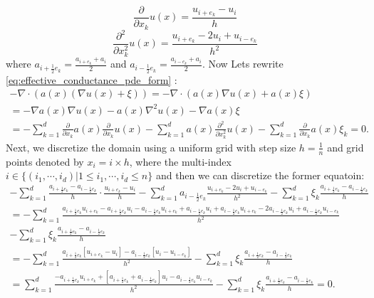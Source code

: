 \begin{equation}
\frac{\partial}{\partial x_k} u(x) = \frac{u_{i+e_{k}} - u_{i}}{h}
\end{equation}
\begin{equation}
\frac{\partial^2}{\partial x_k^2} u(x) = \frac{u_{i+e_{k}} - 2 u_{i} + u_{i-e_{k}}}{h^2}
\end{equation}
where $a_{i+\frac{1}{2}e_{k}} = \frac{a_{i+e_{k}} + a_{i}}{2}$ and $a_{i-\frac{1}{2}e_{k}} = \frac{a_{i-e_{k}} + a_{i}}{2}$. Now Lets rewrite \eqref{eq:effective_conductance_pde_form} :
\begin{multline*}
-\nabla\cdot (a(x)(\nabla u(x)+\xi)) = -\nabla\cdot (a(x)\nabla u(x) + a(x) \xi) \\
= -\nabla a(x) \nabla u(x) - a(x) \nabla^2 u(x) - \nabla a(x)\xi \\
= - \sum_{k=1}^{d} \frac{\partial}{\partial x_k} a(x) \frac{\partial}{\partial x_k} u(x) - \sum_{k=1}^{d} a(x) \frac{\partial^2}{\partial x_k^2} u(x) - \sum_{k=1}^{d} \frac{\partial}{\partial x_k} a(x) \xi_k = 0.
\end{multline*}
Next, we discretize the domain using a uniform grid with step size $h=\frac{1}{n}$ and grid points denoted by $x_i = i \times h$, where the multi-index $i\in\{(i_1,\cdots,i_d)| 1\leq i_1,\cdots,i_d\leq n\}$ and then we can discretize the former equatoin:
\begin{multline*}
-\sum_{k=1}^{d} \frac{a_{i+\frac{1}{2}e_{k}} - a_{i-\frac{1}{2}e_{k}}}{h} \cdot \frac{u_{i+e_{k}} - u_{i}}{h} - \sum_{k=1}^{d} a_{i-\frac{1}{2} e_k}  \frac{u_{i+e_{k}} - 2 u_{i} + u_{i-e_{k}}}{h^2} - \sum_{k=1}^{d} \xi_k \frac{a_{i+\frac{1}{2}e_{k}} - a_{i-\frac{1}{2}e_{k}}}{h} \\
= - \sum_{k=1}^{d} \frac{ a_{i+\frac{1}{2}e_{k}} u_{i+e_k} - a_{i+\frac{1}{2}e_{k}} u_i - a_{i-\frac{1}{2}e_{k}} u_{i+e_k} + a_{i-\frac{1}{2}e_{k}} u_i + a_{i-\frac{1}{2}e_{k}} u_{i+e_k} - 2 a_{i-\frac{1}{2}e_{k}} u_i + a_{i-\frac{1}{2}e_{k}} u_{i-e_k}}{h^2} \\ - \sum_{k=1}^{d} \xi_k \frac{a_{i+\frac{1}{2}e_{k}} - a_{i-\frac{1}{2}e_{k}}}{h} \\
= - \sum_{k=1}^{d} \frac{ a_{i+\frac{1}{2}e_{k}} [u_{i+e_k} - u_i] -  a_{i-\frac{1}{2}e_{k}} [u_i - u_{i-e_k}]}{h^2} - \sum_{k=1}^{d} \xi_k \frac{a_{i+\frac{1}{2}e_{k}} - a_{i-\frac{1}{2}e_{k}}}{h}  \\
= \sum_{k=1}^{d} \frac{- a_{i+\frac{1}{2}e_{k}} u_{i+e_k} + [a_{i+\frac{1}{2}e_{k}} + a_{i-\frac{1}{2}e_{k}}] u_i - a_{i-\frac{1}{2}e_{k}} u_{i-e_k}}{h^2} - \sum_{k=1}^{d} \xi_k \frac{a_{i+\frac{1}{2}e_{k}} - a_{i-\frac{1}{2}e_{k}}}{h} = 0.
\end{multline*}
